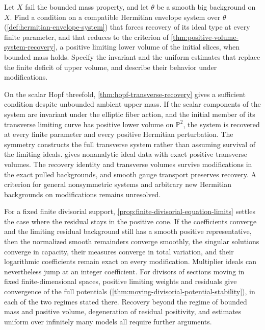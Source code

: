 \begin{problem}\label{qu:positive-system-recovery}
Let $X$ fail the bounded mass property, and let $\theta$ be a smooth big background on $X$. Find a condition on a compatible Hermitian envelope system over $\theta$ (\cref{def:hermitian-envelope-system}) that forces recovery of its ideal type at every finite parameter, and that reduces to the criterion of \cref{thm:positive-volume-system-recovery}, a positive limiting lower volume of the initial slices, when bounded mass holds. Specify the invariant and the uniform estimates that replace the finite deficit of upper volume, and describe their behavior under modifications.
\end{problem}

On the scalar Hopf threefold, \cref{thm:hopf-transverse-recovery} gives a sufficient condition despite unbounded ambient upper mass. If the scalar components of the system are invariant under the elliptic fiber action, and the initial member of its transverse limiting curve has positive lower volume on $\mathbb P^2$, the system is recovered at every finite parameter and every positive Hermitian perturbation. The symmetry constructs the full transverse system rather than assuming survival of the limiting ideals.  gives nonanalytic ideal data with exact positive transverse volumes. The recovery identity and transverse volumes survive modifications in the exact pulled backgrounds, and smooth gauge transport preserves recovery. A criterion for general nonsymmetric systems and arbitrary new Hermitian backgrounds on modifications remains unresolved.

For a fixed finite divisorial support, \cref{prop:finite-divisorial-equation-limits} settles the case where the residual stays in the positive cone. If the coefficients converge and the limiting residual background still has a smooth positive representative, then the normalized smooth remainders converge smoothly, the singular solutions converge in capacity, their measures converge in total variation, and their logarithmic coefficients remain exact on every modification. Multiplier ideals can nevertheless jump at an integer coefficient. For divisors of sections moving in fixed finite-dimensional spaces, positive limiting weights and residuals give convergence of the full potentials (\cref{thm:moving-divisorial-potential-stability}), in each of the two regimes stated there. Recovery beyond the regime of bounded mass and positive volume, degeneration of residual positivity, and estimates uniform over infinitely many models all require further arguments.

